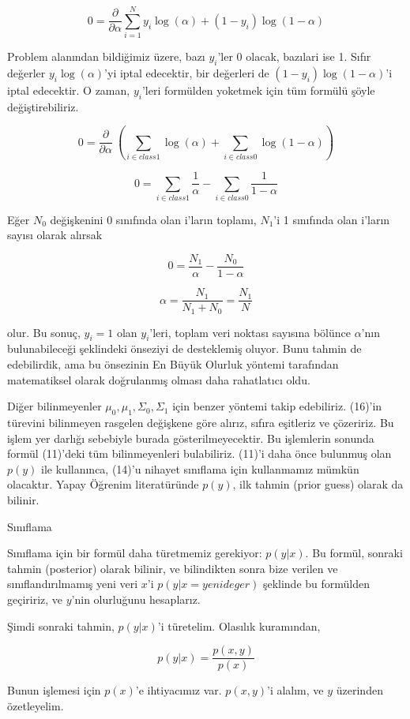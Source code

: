 \documentclass[12pt,fleqn]{article}\usepackage{../../common}
\begin{document}
$$  
  0 =
  \frac{\partial}{\partial \alpha}
  \sum_{i=1}^N y_{i}\log(\alpha) + (1-y_{i})\log(1-\alpha) 
$$

Problem alanından bildiğimiz üzere, bazı $y_{i}$'ler 0 olacak, bazılari ise
1. Sıfır değerler $y_{i}\log(\alpha)$'yi iptal edecektir, bir değerleri de
$(1-y_{i})\log(1-\alpha)$'i iptal edecektir. O zaman, $y_{i}$'leri
formülden yoketmek için tüm formülü şöyle değiştirebiliriz.

$$ 
0 =
\frac{\partial}{\partial \alpha}\
\left(
\sum_{i\in class1} \log(\alpha) +
\sum_{i\in class0} \log(1-\alpha)
\right)
$$

$$ 
0 =
\sum_{i\in class1}\frac{1}{\alpha} -
\sum_{i\in class0}\frac{1}{1-\alpha}
$$

Eğer $N_{0}$ değişkenini 0 sınıfında olan i'ların toplamı, $N_{1}$'i 1
sınıfında olan i'ların sayısı olarak alırsak

$$ 
0 = \frac{N_{1}}{\alpha}-\frac{N_{0}}{1-\alpha} 
$$

$$ 
\alpha = \frac{N_{1}}{N_{1}+N_{0}} = \frac{N_{1}}{N}
$$

olur. Bu sonuç, $y_{i}=1$ olan $y_{i}$'leri, toplam veri noktası sayısına
bölünce $\alpha$'nın bulunabileceği şeklindeki önseziyi de desteklemiş
oluyor. Bunu tahmin de edebilirdik, ama bu önsezinin En Büyük Olurluk yöntemi
tarafından matematiksel olarak doğrulanmış olması daha rahatlatıcı oldu. 

Diğer bilinmeyenler $\mu_{0}, \mu_{1}, \Sigma_{0}, \Sigma_{1}$ için benzer
yöntemi takip edebiliriz. (16)'in türevini bilinmeyen rasgelen değişkene
göre alırız, sıfıra eşitleriz ve çözeririz. Bu işlem yer darlığı sebebiyle
burada gösterilmeyecektir. Bu işlemlerin sonunda formül (11)'deki tüm
bilinmeyenleri bulabiliriz. (11)'i daha önce bulunmuş olan $p(y)$ ile
kullanınca, (14)'u nihayet sınıflama için kullanmamız mümkün
olacaktır. Yapay Öğrenim literatüründe $p(y)$, ilk tahmin (prior guess)
olarak da bilinir.

Sınıflama

Sınıflama için bir formül daha türetmemiz gerekiyor: $p(y|x)$. Bu formül,
sonraki tahmin (posterior) olarak bilinir, ve bilindikten sonra bize
verilen ve sınıflandırılmamış yeni veri $x$'i $p(y|x=yeni deger)$ şeklinde
bu formülden geçiririz, ve $y$'nin olurluğunu hesaplarız.

Şimdi sonraki tahmin, $p(y|x)$'i türetelim. Olasılık kuramından,

$$
p(y|x) = \frac{p(x,y)}{p(x)} 
$$

Bunun işlemesi için $p(x)$'e ihtiyacımız var. $p(x,y)$'i alalım, ve $y$
üzerinden özetleyelim.
\end{document}
